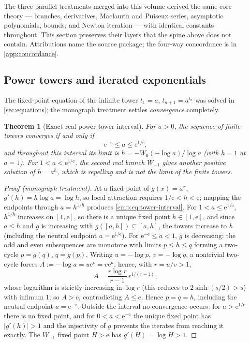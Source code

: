 \documentclass[11pt]{article}
\newtheorem{theorem}{Theorem}[section]
\theoremstyle{remark}
\newcommand{\ee}{\mathrm e}
\newcommand{\abs}[1]{\left|#1\right|}
\begin{document}
The three parallel treatments merged into this volume derived the same core
theory --- branches, derivatives, Maclaurin and Puiseux series, asymptotic
polynomials, bounds, and Newton iteration --- with identical constants
throughout.  This section preserves their layers that the spine above does
not contain.  Attributions name the source package; the four-way concordance
is in \cref{app:concordance}.

\subsection{Power towers and iterated exponentials}

The fixed-point equation of the infinite tower
\(t_1=a\), \(t_{n+1}=a^{t_n}\) was solved in
\cref{sec:equations}; the monograph treatment settles \emph{convergence}
completely.

\begin{theorem}[Exact real power-tower interval]\label{cmp:thm:powertower}
For \(a>0\), the sequence of finite towers converges if and only if
\begin{equation}\label{cmp:eq:tower-interval}
 \ee^{-\ee}\le a\le\ee^{1/\ee},
\end{equation}
and throughout this interval its limit is
\(h=-W_0(-\log a)/\log a\) (with \(h=1\) at \(a=1\)).  For
\(1<a<\ee^{1/\ee}\), the second real branch \(W_{-1}\) gives another positive
solution of \(h=a^h\), which is repelling and is not the limit of the finite
towers.
\end{theorem}

\begin{proof}[Proof (monograph treatment)]
At a fixed point of \(g(x)=a^x\), \(g'(h)=h\log a=\log h\), so local
attraction requires \(1/\ee<h<\ee\); mapping the endpoints through
\(a=h^{1/h}\) produces \eqref{cmp:eq:tower-interval}.  For
\(1<a\le\ee^{1/\ee}\), \(h^{1/h}\) increases on \([1,\ee]\), so there is a
unique fixed point \(h\in[1,\ee]\), and since \(a\le h\) and \(g\) is
increasing with \(g([a,h])\subseteq[a,h]\), the towers increase to \(h\)
(including the neutral endpoint \(a=\ee^{1/\ee}\)).  For
\(\ee^{-\ee}\le a<1\), \(g\) is decreasing: the odd and even subsequences
are monotone with limits \(p\le h\le q\) forming a two-cycle
\(p=g(q)\), \(q=g(p)\).  Writing \(u=-\log p\), \(v=-\log q\), a nontrivial
two-cycle forces \(A:=-\log a=u\ee^v=v\ee^u\), hence, with \(r=u/v>1\),
\[
 A=\frac{r\log r}{r-1}\,r^{1/(r-1)},
\]
whose logarithm is strictly increasing in \(\log r\) (this reduces to
\(2\sinh(s/2)>s\)) with infimum \(1\); so \(A>\ee\), contradicting
\(A\le\ee\).  Hence \(p=q=h\), including the neutral endpoint
\(a=\ee^{-\ee}\).  Outside the interval no convergence occurs: for
\(a>\ee^{1/\ee}\) there is no fixed point, and for \(0<a<\ee^{-\ee}\) the
unique fixed point has \(\abs{g'(h)}>1\) and the injectivity of \(g\)
prevents the iterates from reaching it exactly.  The \(W_{-1}\) fixed point
\(H>\ee\) has \(g'(H)=\log H>1\).
\end{proof}
\end{document}
